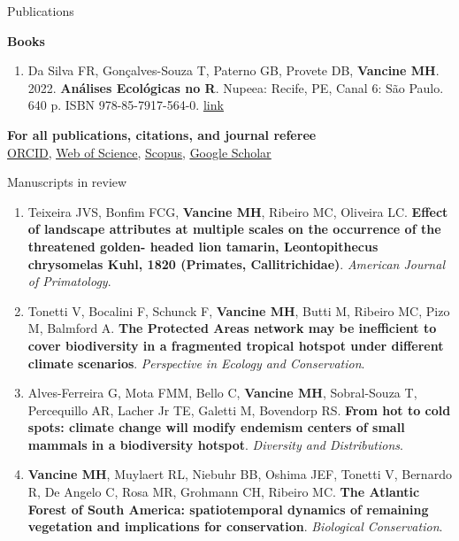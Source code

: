 \documentclass{resume}
\begin{document}
\begin{rSection}{Publications}
\begin{enumerate}
\end{enumerate} 

{\bf Books}

\begin{enumerate} 
\item Da Silva FR, Gonçalves-Souza T, Paterno GB, Provete DB, {\bf Vancine MH}. 2022. {\bf Análises Ecológicas no R}. Nupeea: Recife, PE, Canal 6: São Paulo. 640 p. ISBN 978-85-7917-564-0. \href{https://analises-ecologicas.com/}{\underline{link}}
\end{enumerate} 

{\bf For all publications, citations, and journal referee}
\\ \href{https://orcid.org/0000-0001-9650-7575}{\underline{ORCID}}, \href{https://www.webofscience.com/wos/author/record/837504}{\underline{Web of Science}}, \href{https://www.scopus.com/authid/detail.uri?authorId=57193451888}{\underline{Scopus}}, \href{https://scholar.google.com/citations?user=i-2xZBQAAAAJ}{\underline{Google Scholar}}

\end{rSection}


\begin{rSection}{Manuscripts in review}

\begin{enumerate} 

\item Teixeira JVS, Bonfim FCG, {\bf Vancine MH}, Ribeiro MC, Oliveira LC. {\bf Effect
of landscape attributes at multiple scales on the occurrence of the threatened golden-
headed lion tamarin, Leontopithecus chrysomelas Kuhl, 1820 (Primates, Callitrichidae)}.
{\it American Journal of Primatology}.

\item Tonetti V, Bocalini F, Schunck F, {\bf Vancine MH}, Butti M, Ribeiro MC, Pizo M,
Balmford A. {\bf The Protected Areas network may be inefficient to cover biodiversity in a
fragmented tropical hotspot under different climate scenarios}. {\it Perspective in Ecology and
Conservation}.

\item Alves-Ferreira G, Mota FMM, Bello C, {\bf Vancine MH}, Sobral-Souza T, Percequillo AR, Lacher Jr TE, Galetti M, Bovendorp RS. {\bf From hot to cold spots: climate change will modify endemism centers of small mammals in a biodiversity hotspot}. {\it Diversity and Distributions}.

\item {\bf Vancine MH}, Muylaert RL, Niebuhr BB, Oshima JEF, Tonetti V, Bernardo R, De Angelo C, Rosa MR, Grohmann CH, Ribeiro MC. {\bf The Atlantic Forest of South America: spatiotemporal dynamics of remaining vegetation and implications for conservation}. {\it Biological Conservation}.

\end{enumerate} 

\end{rSection}
\end{document}
